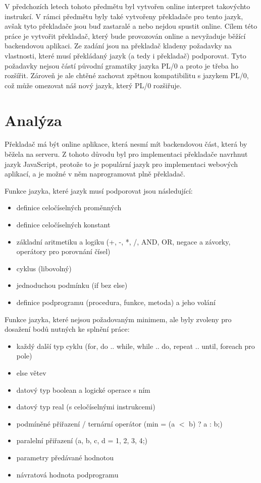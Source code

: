 \documentclass[12pt, letterpaper]{article}
\begin{document}
V předchozích letech tohoto předmětu byl vytvořen online interpret takovýchto instrukcí. V rámci předmětu byly také 
vytvořeny překladače pro tento jazyk, avšak tyto překladače jsou buď zastaralé a nebo nejdou spustit online. Cílem 
této práce je vytvořit překladač, který bude provozován online a nevyžaduje běžící backendovou aplikaci. Ze zadání
jsou na překladač kladeny požadavky na vlastnosti, které musí překládaný jazyk (a tedy i překladač) podporovat. Tyto 
požadavky nejsou částí původní gramatiky jazyka PL/0 a proto je třeba ho rozšířit. Zároveň je ale chtěné zachovat
zpětnou kompatibilitu s jazykem PL/0, což může omezovat náš nový jazyk, který PL/0 rozšiřuje.
%
\section{Analýza}
Překladač má být online aplikace, která nesmí mít backendovou část, která by běžela na serveru. Z tohoto důvodu byl
pro implementaci překladače navrhnut jazyk JavaScript, protože to je populární jazyk pro implementaci webových aplikací,
a je možné v něm naprogramovat plně  překladač.

\hfill \break
\noindent Funkce jazyka, které jazyk musí podporovat jsou následující:
%
\begin{itemize}
    \item definice celočíselných proměnných
    \item definice celočíselných konstant
    \item základní aritmetiku a logiku (+, -, *, /, AND, OR, negace a závorky, operátory pro porovnání čísel)
    \item cyklus (libovolný)
    \item jednoduchou podmínku (if bez else)
    \item definice podprogramu (procedura, funkce, metoda) a jeho volání
\end{itemize}
%
\noindent Funkce jazyka, které nejsou požadovaným minimem, ale byly zvoleny pro dosažení bodů nutných ke splnění práce:
%
\begin{itemize}
    \item každý další typ cyklu (for, do .. while, while .. do, repeat .. until, foreach pro pole)
    \item else větev
    \item datový typ boolean a logické operace s ním
    \item datový typ real (s celočíselnými instrukcemi)
    \item podmíněné přiřazení / ternární operátor (min = (a $<$ b) ? a : b;)
    \item paralelní přiřazení ({a, b, c, d} = {1, 2, 3, 4};)
    \item parametry předávané hodnotou
    \item návratová hodnota podprogramu
\end{itemize}
\end{document}
